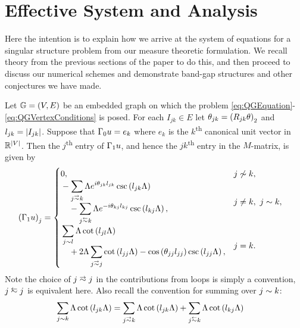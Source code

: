 \section{Effective System and Analysis} \label{sec:SystemAndAnalysis}

Here the intention is to explain how we arrive at the system of equations for a singular structure problem from our measure theoretic formulation.
We recall theory from the previous sections of the paper to do this, and then proceed to discuss our numerical schemes and demonstrate band-gap structures and other conjectures we have made.

\begin{prop} \label{prop:M-MatrixEntries}
	Let $\mathbb{G}=\left( V,E \right)$ be an embedded graph on which the problem \eqref{eq:QGEquation}-\eqref{eq:QGVertexConditions} is posed.
	For each $I_{jk}\in E$ let $\theta_{jk} = \left( R_{jk}\theta \right)_2$ and $l_{jk} = \left\lvert I_{jk} \right\rvert$.
	Suppose that $\Gamma_0 u = e_k$ where $e_k$ is the $k$\textsuperscript{th} canonical unit vector in $\mathbb{R}^{\left\lvert V \right\rvert}$.
	Then the $j$\textsuperscript{th} entry of $\Gamma_1 u$, and hence the $jk$\textsuperscript{th} entry in the $M$-matrix, is given by
	\begin{align*}
		\bracs{\nmap u}_j &= 
		\begin{cases}
			\!\begin{aligned}
				&0,
			\end{aligned}			
			& j \not\con k, \\
			\!\begin{aligned}
				&-\sum_{j\conLeft k} \effFreq e^{i\qm_{jk}l_{jk}} \csc\bracs{l_{jk}\effFreq} 
				\\ &\quad - \sum_{j\conRight k} \effFreq e^{-i\qm_{kj}l_{kj}} \csc\bracs{l_{kj}\effFreq},
			\end{aligned}
			& j\neq k, \ j\con k, \\
			\!\begin{aligned}
				&\sum_{j\con l} \effFreq\cot\bracs{l_{jl}\effFreq}
				\\ &\quad + 2\effFreq\sum_{j\conLeft j} \cot\bracs{l_{jj}\effFreq} - \cos\bracs{\qm_{jj}l_{jj}}\csc\bracs{l_{jj}\effFreq},
			\end{aligned}
			& j=k.
		\end{cases}
	\end{align*}
	Note the choice of $j\conLeft j$ in the contributions from loops is simply a convention, $j\conRight j$ is equivalent here.
	Also recall the convention for summing over $j\sim k$:
	\begin{align*}
		\sum_{j\con k} \effFreq\cot\bracs{l_{jk}\effFreq} &= \sum_{j\conLeft k} \effFreq\cot\bracs{l_{jk}\effFreq}	+ \sum_{j\conRight k} \effFreq\cot\bracs{l_{kj}\effFreq}
	\end{align*}
\end{prop}
